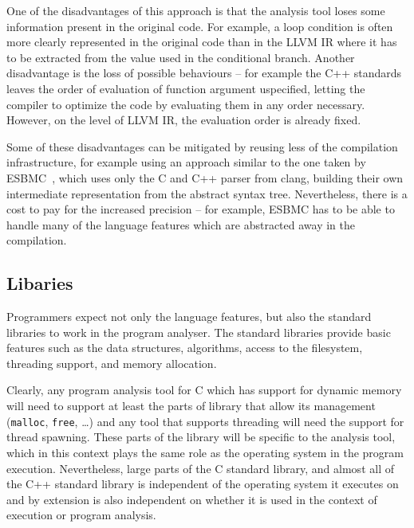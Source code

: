 One of the disadvantages of this approach is that the analysis tool loses some
information present in the original code.
For example, a loop condition is often more clearly represented in the original
code than in the LLVM IR where it has to be extracted from the value used in
the conditional branch.
Another disadvantage is the loss of possible behaviours -- for example the C++ standards leaves the order of evaluation of function argument uspecified, letting the compiler to optimize the code by evaluating them in any order necessary.
However, on the level of LLVM IR, the evaluation order is already fixed.

Some of these disadvantages can be mitigated by reusing less of the compilation
infrastructure, for example using an approach similar to the one taken by
ESBMC~, which uses only the C and C++ parser from clang,
building their own intermediate representation from the abstract syntax tree.
Nevertheless, there is a cost to pay for the increased precision -- for example, ESBMC has to be able to handle many of the language features which are abstracted away in the compilation.

\subsection{Libaries}

Programmers expect not only the language features, but also the standard
libraries to work in the program analyser.
The standard libraries provide basic features such as the data structures, algorithms, access to the filesystem, threading support, and memory allocation.

Clearly, any program analysis tool for C which has support for dynamic memory will need to support at least the parts of library that allow its management (\texttt{malloc}, \texttt{free}, …) and any tool that supports threading will need the support for thread spawning.
These parts of the library will be specific to the analysis tool, which in
this context plays the same role as the operating system in the program
execution.
Nevertheless, large parts of the C standard library, and almost all of the C++
standard library is independent of the operating system it executes on and by
extension is also independent on whether it is used in the context of execution
or program analysis.

